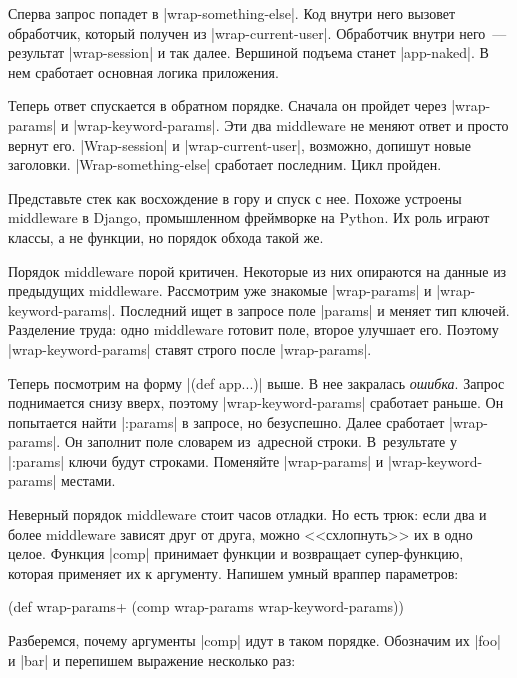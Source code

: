 Сперва запрос попадет в \spverb|wrap-something-else|. Код внутри него вызовет
обработчик, который получен из \spverb|wrap-current-user|. Обработчик внутри
него~--- результат \spverb|wrap-session| и так далее. Вершиной подъема станет
\spverb|app-naked|. В нем сработает основная логика приложения.

Теперь ответ спускается в обратном порядке. Сначала он пройдет через
\spverb|wrap-params| и \spverb|wrap-keyword-params|. Эти два middleware не
меняют ответ и просто вернут его. \spverb|Wrap-session| и
\spverb|wrap-current-user|, возможно, допишут новые заголовки.
\spverb|Wrap-something-else| сработает последним. Цикл пройден.

Представьте стек как восхождение в гору и спуск с нее. Похоже устроены
middleware в Django, промышленном фреймворке на Python. Их роль играют классы, а
не функции, но порядок обхода такой же.

Порядок middleware порой критичен. Некоторые из них опираются на данные из
предыдущих middleware. Рассмотрим уже знакомые \spverb|wrap-params| и
\spverb|wrap-keyword-params|. Последний ищет в запросе поле \spverb|params| и
меняет тип ключей. Разделение труда: одно middleware готовит поле, второе
улучшает его. Поэтому \spverb|wrap-keyword-params| ставят строго после
\spverb|wrap-params|.

Теперь посмотрим на форму \spverb|(def app...)| выше. В нее закралась
\emph{ошибка}. Запрос поднимается снизу вверх, поэтому
\spverb|wrap-keyword-params| сработает раньше. Он попытается найти
\spverb|:params| в запросе, но безуспешно. Далее сработает
\spverb|wrap-params|. Он заполнит поле словарем из~адресной строки. В~результате
у \spverb|:params| ключи будут строками. Поменяйте \spverb|wrap-params| и
\spverb|wrap-keyword-params| местами.

Неверный порядок middleware стоит часов отладки. Но есть трюк: если два и более
middleware зависят друг от друга, можно <<схлопнуть>> их в одно целое. Функция
\spverb|comp| принимает функции и возвращает супер-функцию, которая
применяет их к аргументу. Напишем умный враппер параметров:

\begin{english}
  \begin{clojure}
(def wrap-params+ (comp wrap-params wrap-keyword-params))
  \end{clojure}
\end{english}

Разберемся, почему аргументы \spverb|comp| идут в таком порядке. Обозначим их
\spverb|foo| и \spverb|bar| и перепишем выражение несколько раз:


